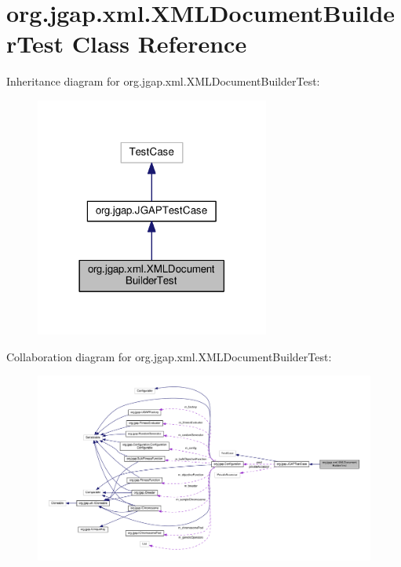 \hypertarget{classorg_1_1jgap_1_1xml_1_1_x_m_l_document_builder_test}{\section{org.\-jgap.\-xml.\-X\-M\-L\-Document\-Builder\-Test Class Reference}
\label{classorg_1_1jgap_1_1xml_1_1_x_m_l_document_builder_test}
}


Inheritance diagram for org.\-jgap.\-xml.\-X\-M\-L\-Document\-Builder\-Test\-:
\nopagebreak
\begin{figure}[H]
\begin{center}
\leavevmode
\includegraphics[width=218pt]{classorg_1_1jgap_1_1xml_1_1_x_m_l_document_builder_test__inherit__graph}
\end{center}
\end{figure}


Collaboration diagram for org.\-jgap.\-xml.\-X\-M\-L\-Document\-Builder\-Test\-:
\nopagebreak
\begin{figure}[H]
\begin{center}
\leavevmode
\includegraphics[width=350pt]{classorg_1_1jgap_1_1xml_1_1_x_m_l_document_builder_test__coll__graph}
\end{center}
\end{figure}
